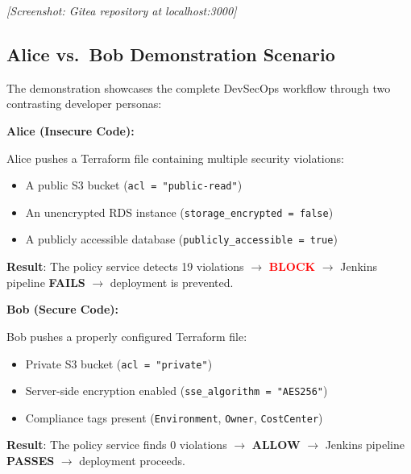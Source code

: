 
\textit{[Screenshot: Gitea repository at localhost:3000]}

\subsection{Alice vs.\ Bob Demonstration Scenario}

The demonstration showcases the complete DevSecOps workflow through two contrasting developer personas:

\vspace{0.3cm}
\noindent\textbf{Alice (Insecure Code):}

Alice pushes a Terraform file containing multiple security violations:
\begin{itemize}
    \item A public S3 bucket (\texttt{acl = "public-read"})
    \item An unencrypted RDS instance (\texttt{storage\_encrypted = false})
    \item A publicly accessible database (\texttt{publicly\_accessible = true})
\end{itemize}

\noindent\textbf{Result}: The policy service detects 19 violations $\rightarrow$ \textcolor{red}{\textbf{BLOCK}} $\rightarrow$ Jenkins pipeline \textbf{FAILS} $\rightarrow$ deployment is prevented.

\vspace{0.3cm}
\noindent\textbf{Bob (Secure Code):}

Bob pushes a properly configured Terraform file:
\begin{itemize}
    \item Private S3 bucket (\texttt{acl = "private"})
    \item Server-side encryption enabled (\texttt{sse\_algorithm = "AES256"})
    \item Compliance tags present (\texttt{Environment}, \texttt{Owner}, \texttt{CostCenter})
\end{itemize}

\noindent\textbf{Result}: The policy service finds 0 violations $\rightarrow$ \textcolor{green!50!black}{\textbf{ALLOW}} $\rightarrow$ Jenkins pipeline \textbf{PASSES} $\rightarrow$ deployment proceeds.

